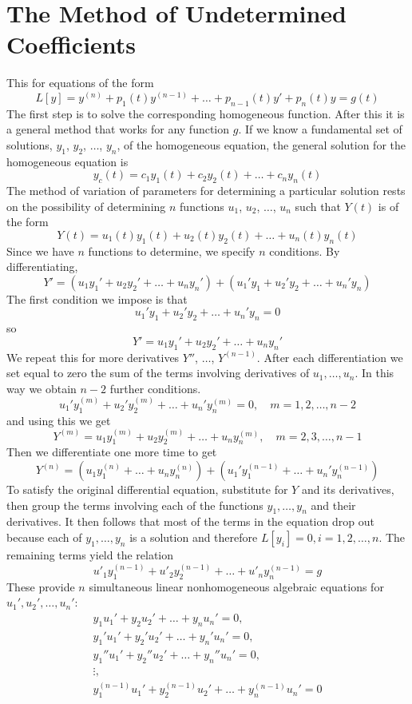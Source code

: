 \section{The Method of Undetermined Coefficients}
    This for equations of the form
    $$L[y] = y^{(n)} + p_1(t)y^{(n-1)} + \dots + p_{n-1}(t)y' + p_n(t)y = g(t)$$
    The first step is to solve the corresponding homogeneous function. After this it is a general method that works for any function $g$. If we know a fundamental set of solutions, $y_1$, $y_2$, $\dots$, $y_n$, of the homogeneous equation, the general solution for the homogeneous equation is
    $$y_c(t) = c_1y_1(t) + c_2y_2(t) + \dots + c_ny_n(t)$$
    The method of variation of parameters for determining a particular solution rests on the possibility of determining $n$ functions $u_1$, $u_2$, $\dots$, $u_n$ such that $Y(t)$ is of the form
    $$Y(t) = u_1(t)y_1(t) + u_2(t)y_2(t) + \dots + u_n(t)y_n(t)$$
    Since we have $n$ functions to determine, we specify $n$ conditions. By differentiating,
    $$Y' = (u_1y_1' + u_2y_2' + \dots + u_ny_n') + (u_1'y_1 + u_2'y_2 + \dots + u_n'y_n)$$
    The first condition we impose is that
    $$u_1'y_1 + u_2'y_2 + \dots + u_n'y_n = 0$$
    so
    $$Y' = u_1y_1' + u_2y_2' + \dots + u_ny_n'$$
    We repeat this for more derivatives $Y''$, $\dots$, $Y^{(n-1)}$. After each differentiation we set equal to zero the sum of the terms involving derivatives of $u_1,\dots,u_n$. In this way we obtain $n-2$ further conditions.
    $$u_1'y_1^{(m)} + u_2'y_2^{(m)} + \dots + u_n'y_n^{(m)} = 0, \quad m = 1,2,\dots, n-2$$
    and using this we get
    $$Y^{(m)} = u_1y_1^{(m)} + u_2y_2^{(m)} + \dots + u_ny_n^{(m)}, \quad m = 2,3,\dots, n-1$$
    Then we differentiate one more time to get
    $$Y^{(n)} = (u_1y_1^{(n)} + \dots + u_ny_n^{(n)}) + (u_1'y_1^{(n - 1)} + \dots + u_n'y_n^{(n - 1)})$$
    To satisfy the original differential equation, substitute for $Y$ and its derivatives, then group the terms involving each of the functions $y_1,\dots,y_n$ and their derivatives. It then follows that most of the terms in the equation drop out because each of $y_1,\dots,y_n$ is a solution and therefore $L[y_i]=0, i=1,2,\dots,n$. The remaining terms yield the relation
    $$u'_1y_1^{(n-1)} + u'_2y_2^{(n-1)} + \dots + u'_ny_n^{(n-1)} = g$$
    These provide $n$ simultaneous linear nonhomogeneous algebraic equations for $u_1', u_2', \dots, u_n'$:
    \begin{align*}
        y_1u_1' + y_2u_2' + \dots + y_nu_n' = 0, \\
        y_1'u_1' + y_2'u_2' + \dots + y_n'u_n' = 0, \\
        y_1''u_1' + y_2''u_2' + \dots + y_n''u_n' = 0, \\
        \vdots, \\
        y_1^{(n-1)}u_1' + y_2^{(n-1)}u_2' + \dots + y_n^{(n-1)}u_n' = 0
    \end{align*}
